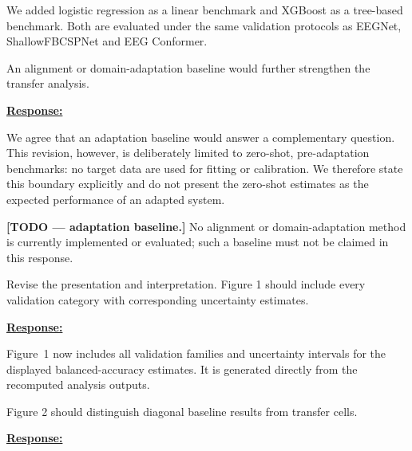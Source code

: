 \documentclass{article}
\begin{document}
We added logistic regression as a linear benchmark and XGBoost as a tree-based
benchmark. Both are evaluated under the same validation protocols as EEGNet,
ShallowFBCSPNet and EEG Conformer.

\vspace{0.3cm}


\begin{cmt}{}{}

An alignment or domain-adaptation baseline would further strengthen the transfer
analysis.

\end{cmt}
\vspace{0.1cm}
\noindent
\underline{\textbf{Response:}}
\vspace{0.2cm}

We agree that an adaptation baseline would answer a complementary question.
This revision, however, is deliberately limited to zero-shot, pre-adaptation
benchmarks: no target data are used for fitting or calibration. We therefore
state this boundary explicitly and do not present the zero-shot estimates as the
expected performance of an adapted system.

\textbf{[TODO --- adaptation baseline.]}
No alignment or domain-adaptation method is currently implemented or evaluated;
such a baseline must not be claimed in this response.

\vspace{0.3cm}


\begin{cmt}{}{}

Revise the presentation and interpretation. Figure 1 should include every
validation category with corresponding uncertainty estimates.

\end{cmt}
\vspace{0.1cm}
\noindent
\underline{\textbf{Response:}}
\vspace{0.2cm}

Figure~1 now includes all validation families and uncertainty intervals for the
displayed balanced-accuracy estimates. It is generated directly from the
recomputed analysis outputs.

\vspace{0.3cm}


\begin{cmt}{}{}

Figure 2 should distinguish diagonal baseline results from transfer cells.

\end{cmt}
\vspace{0.1cm}
\noindent
\underline{\textbf{Response:}}
\vspace{0.2cm}
\end{document}
